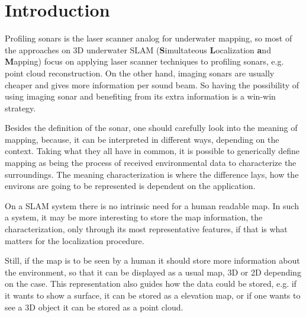 \chapter{Introduction}


Profiling sonars is the laser scanner analog for underwater mapping,
so most of the approaches on 3D underwater SLAM (\textbf{S}imultateous
\textbf{L}ocalization \textbf{a}nd \textbf{M}apping) focus on applying laser
scanner techniques to profiling sonars, e.g.
point cloud reconstruction. On the other hand, imaging sonars are usually cheaper and gives more information per sound
beam. So having the possibility of using imaging sonar and benefiting from its
extra information is a win-win strategy.

Besides the definition of the sonar, one should carefully look into the meaning
of mapping, because, it can be interpreted in different ways, depending on the
context.
Taking what they all have in common, it is possible to generically define
mapping as being the process of received environmental data to characterize
the surroundings. The meaning characterization is where the
difference lays, how the environs are going to be represented is dependent on
the application.

On a SLAM system there is no intrinsic need for a human readable map. In such a
system, it may be more interesting to store the map information, the
characterization, only through its most representative features, if that is
what matters for the localization procedure.

Still, if the map is to be seen by a human it should store more information
about the environment, so that it can be displayed as a usual map, 3D or 2D
depending on the case. This representation also guides how the data could be
stored, e.g. if it wants to show a surface, it can be stored as a elevation map,
or if one wants to see a 3D object it can be stored as a point cloud.






